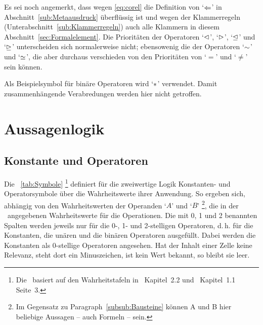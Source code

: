 \documentclass[english,ngerman,parskip=half,headsepline,footsepline,
	fleqn,notitlepage]{scrreprt}
\makeatletter
\newcommand*{\texthead}[1]{\textnormal{\textsf{\textbf{#1}}}}%
\newcommand*{\Lohead}[1]{\lohead{\texthead{#1}}}
\newcommand*{\Cohead}[1]{\cohead{\texthead{#1}}}
\newcommand*{\Pagestyle}{\pagestyle{scrheadings}}
\newcommand*{\beginsection}[1]{%
	\Cohead{#1}%
	\Lohead{\sectionname~\thesection}%
	\Pagestyle%
}
\newcommand*{\charqt}[1]{\enquote*{#1}}%
\newcommand*{\symqt}[1]{\charqt{$#1$}}%
\newcommand*{\sectionname}{Abschnitt}
\newcommand*{\subsectionname}{Unterabschnitt}
\newcommand*{\subsubsectionname}{Paragraph}
\newcommand*{\textdh}{d.\@\,h.\@ }
\makeatother
\begin{document}
	Es sei noch angemerkt, dass wegen \vref{eq:corel}
	die Definition von \symqt{\metarep} in \sectionname~\vref{sub:Metaausdruck}
	überflüssig ist
	und wegen der Klammerregeln
	(\seename \subsectionname~\vref{sub:Klammerregeln})
	auch alle Klammern in diesem \sectionname~\ref{sec:Formalelement}.
	Die Prioritäten der Operatoren \symqt{\lrelbsp}, \symqt{\rrelbsp},
	\symqt{\lreleqbsp} und \symqt{\rreleqbsp}
	unterscheiden sich normalerweise nicht;
	ebensowenig die der Operatoren \symqt{\relbsp} und \symqt{\releqbsp},
	die aber durchaus verschieden von den Prioritäten
	von \symqt{=} und \symqt{\ne} sein können.

	Als Beispielsymbol für binäre Operatoren wird \symqt{\opbsp} verwendet.
	Damit zusammenhängende Verabredungen werden hier nicht getroffen.

	\section{Aussagenlogik}%
	\beginsection{Aussagenlogik}
	\label{sec:Aussagenlogik}

	\subsection{Konstante und Operatoren}%
	\label{sub:Operatoren}

	Die \tablename~\vref{tab:Symbole}
	\footnote{%
		Die \tablename\ basiert auf den Wahrheitstafeln in~\cite{bib:Junktor}
		Kapitel~2.2 und~\cite{bib:Rautenberg} Kapitel~1.1 Seite~3.%
	}
	definiert für die zweiwertige Logik Konstanten- und Operatorsymbole
	über die Wahrheitswerte ihrer Anwendung.
	So ergeben sich,
	abhängig von den Wahrheitswerten der Operanden \symqt{A} und \symqt{B}
	\footnote{%
		Im Gegensatz zu \subsubsectionname~\vref{subsub:Bausteine}
		können A und B hier beliebige Aussagen -- auch Formeln -- sein.%
	},
	die in der \tablename\ angegebenen Wahrheitswerte für die Operationen.
	Die mit 0, 1 und 2 benannten Spalten werden jeweils
	nur für die 0-, 1- und 2-stelligen Operatoren, \textdh
	für die Konstanten, die unären und die binären Operatoren ausgefüllt.
	Dabei werden die Konstanten als 0-stellige Operatoren angesehen.
	Hat der Inhalt einer Zelle keine Relevanz, steht dort ein Minuszeichen,
	ist kein Wert bekannt, so bleibt sie leer.
\end{document}
